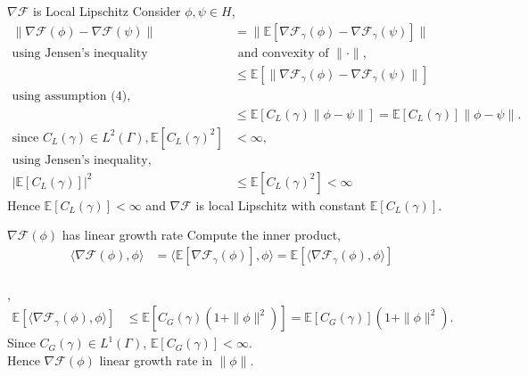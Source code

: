 \begin{frame}{$\nabla \mathcal{F}$ is Local Lipschitz}
    Consider $\phi, \psi \in H$,
    \begin{align*}
        \|\nabla \mathcal{F}(\phi) - \nabla \mathcal{F}(\psi) \| &= \| \mathbb{E}[\nabla \mathcal{F}_{\gamma}(\phi) - \nabla \mathcal{F}_{\gamma}(\psi) ]\|\\
        \text{using Jensen's inequality }& \text{ and convexity of $\|\cdot\|$,}\\
        & \leq \mathbb{E}[\|\nabla \mathcal{F}_{\gamma}(\phi) - \nabla \mathcal{F}_{\gamma}(\psi)\|]\\
        \text{using assumption (4),}\qquad&\\
        & \leq \mathbb{E}[C_L(\gamma) \| \phi - \psi \|] = \mathbb{E}[C_L(\gamma)] \|\phi - \psi \|.\\
        \text{since }C_L(\gamma) \in L^2(\Gamma), \mathbb{E}[C_{L}(\gamma)^2] &< \infty,\\
        \text{using Jensen's inequality,}\quad &\\
        |\mathbb{E}[C_L(\gamma)]|^2& \leq \mathbb{E}[C_{L}(\gamma)^2] < \infty
    \end{align*}
    Hence $\mathbb{E}[C_L(\gamma)] < \infty$ and $\nabla \mathcal{F}$ is local Lipschitz with constant $\mathbb{E}[C_L(\gamma)]$.
\end{frame}



\begin{frame}{$\nabla \mathcal{F}(\phi)$ has linear growth rate}
    Compute the inner product,
    \begin{align*}
        \langle \nabla \mathcal{F}(\phi), \phi\rangle &= \langle \mathbb{E}[\nabla \mathcal{F}_{\gamma}(\phi)], \phi\rangle = \mathbb{E}[\langle \nabla \mathcal{F}_{\gamma}(\phi), \phi\rangle]
    \end{align*}\\
    ,\\
    \begin{align*}
        \mathbb{E}[\langle \nabla \mathcal{F}_{\gamma}(\phi), \phi\rangle] &\leq \mathbb{E}[C_G(\gamma)(1 + \|\phi\|^2)] = \mathbb{E}[C_G(\gamma)](1 + \|\phi\|^2).
    \end{align*}
    Since $C_G(\gamma) \in L^1(\Gamma)$, $\mathbb{E}[C_G(\gamma)] < \infty$.\\
    Hence $\nabla \mathcal{F}(\phi)$ linear growth rate in $\|\phi\|$.
\end{frame}

